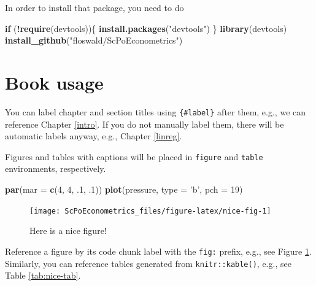 \documentclass[]{book}
\newenvironment{Shaded}{\begin{snugshade}}{\end{snugshade}}
\newcommand{\KeywordTok}[1]{\textcolor[rgb]{0.13,0.29,0.53}{\textbf{#1}}}
\newcommand{\DataTypeTok}[1]{\textcolor[rgb]{0.13,0.29,0.53}{#1}}
\newcommand{\DecValTok}[1]{\textcolor[rgb]{0.00,0.00,0.81}{#1}}
\newcommand{\StringTok}[1]{\textcolor[rgb]{0.31,0.60,0.02}{#1}}
\newcommand{\ControlFlowTok}[1]{\textcolor[rgb]{0.13,0.29,0.53}{\textbf{#1}}}
\newcommand{\OperatorTok}[1]{\textcolor[rgb]{0.81,0.36,0.00}{\textbf{#1}}}
\newcommand{\NormalTok}[1]{#1}
\theoremstyle{definition}
\theoremstyle{definition}
\theoremstyle{definition}
\theoremstyle{remark}
\begin{document}
In order to install that package, you need to do

\begin{Shaded}
\begin{Highlighting}[]
\ControlFlowTok{if}\NormalTok{ (}\OperatorTok{!}\KeywordTok{require}\NormalTok{(devtools))\{}
  \KeywordTok{install.packages}\NormalTok{(}\StringTok{"devtools"}\NormalTok{)}
\NormalTok{\}}
\KeywordTok{library}\NormalTok{(devtools)}
\KeywordTok{install_github}\NormalTok{(}\StringTok{"floswald/ScPoEconometrics"}\NormalTok{)  }
\end{Highlighting}
\end{Shaded}

\section{Book usage}\label{book-usage}

You can label chapter and section titles using \texttt{\{\#label\}}
after them, e.g., we can reference Chapter \ref{intro}. If you do not
manually label them, there will be automatic labels anyway, e.g.,
Chapter \ref{linreg}.

Figures and tables with captions will be placed in \texttt{figure} and
\texttt{table} environments, respectively.

\begin{Shaded}
\begin{Highlighting}[]
\KeywordTok{par}\NormalTok{(}\DataTypeTok{mar =} \KeywordTok{c}\NormalTok{(}\DecValTok{4}\NormalTok{, }\DecValTok{4}\NormalTok{, .}\DecValTok{1}\NormalTok{, .}\DecValTok{1}\NormalTok{))}
\KeywordTok{plot}\NormalTok{(pressure, }\DataTypeTok{type =} \StringTok{'b'}\NormalTok{, }\DataTypeTok{pch =} \DecValTok{19}\NormalTok{)}
\end{Highlighting}
\end{Shaded}

\begin{figure}

{\centering \texttt{[image: ScPoEconometrics\_files/figure-latex/nice-fig-1]} 

}

\caption{Here is a nice figure!}\label{fig:nice-fig}
\end{figure}

Reference a figure by its code chunk label with the \texttt{fig:}
prefix, e.g., see Figure \ref{fig:nice-fig}. Similarly, you can
reference tables generated from \texttt{knitr::kable()}, e.g., see Table
\ref{tab:nice-tab}.
\end{document}
